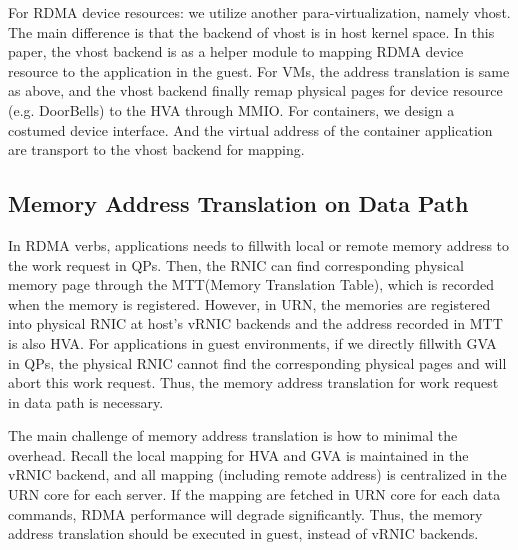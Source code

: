  For RDMA device resources: we utilize another para-virtualization, namely vhost. The main difference is that the backend of vhost is in host kernel space. In this paper, the vhost backend is as a helper module to mapping RDMA device resource to the application in the guest. 
 For VMs, the address translation is same as above, and the vhost backend finally remap physical pages for device resource (e.g. DoorBells) to the HVA through MMIO. For containers, we design a costumed device interface. And the virtual address of the container application are transport to the vhost backend for mapping. 
 
\subsection{Memory Address Translation on Data Path}
In RDMA verbs, applications needs to fillwith local or remote memory address to the work request in QPs. Then, the RNIC can find corresponding physical memory page through the MTT(Memory Translation Table), which is recorded when the memory is registered. However, in URN, the memories are registered into physical RNIC at host's vRNIC backends and the address recorded in MTT is also HVA. For applications in guest environments, if we directly fillwith GVA in QPs, the physical RNIC cannot find the corresponding physical pages and will abort this work request. Thus, the memory address translation for work request in data path is necessary. 


The main challenge of memory address translation is how to minimal the overhead. Recall the local mapping for HVA and GVA is maintained in the vRNIC backend, and all mapping (including remote address) is centralized in the URN core for each server. If the mapping are fetched in URN core for each data commands, RDMA performance will degrade significantly. Thus, the memory address translation should be executed in guest, instead of vRNIC backends. 

